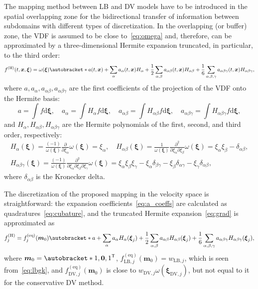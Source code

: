 \documentclass{elsarticle} %
\newcommand{\dd}{\mathrm{d}}
\newcommand{\pder}[2][]{\frac{\partial#1}{\partial#2}}
\newcommand{\pderder}[3][]{\frac{\partial^2#1}{\partial#2\partial#3}}
\newcommand{\pderderder}[4][]{\frac{\partial^3#1}{\partial#2\partial#3\partial#4}}
\newcommand{\transpose}[1]{#1^\mathsf{T}}
\DeclarePairedDelimiter\autobracket()       %
\newcommand{\br}[1]{\autobracket*{#1}}
\newcommand{\dxi}{\dd{\boldsymbol{\xi}}}
\newcommand{\bxi}{\boldsymbol{\xi}}
\newcommand{\bm}{\boldsymbol{m}}
\newcommand{\bx}{\boldsymbol{x}}
\newcommand{\equil}[1]{#1^\mathrm{(eq)}}
\newcommand{\hermite}[1]{#1^\mathrm{(H)}}
\newcommand{\LB}{\mathrm{LB}}
\newcommand{\DV}{\mathrm{DV}}
\newcommand{\Aa}{a_{\alpha}}
\newcommand{\Aab}{a_{\alpha\beta}}
\newcommand{\Aabg}{a_{\alpha\beta\gamma}}
\newcommand{\Ha}{H_{\alpha}}
\newcommand{\Hab}{H_{\alpha\beta}}
\newcommand{\Habg}{H_{\alpha\beta\gamma}}
\newcommand{\xia}{\xi_{\alpha}}
\newcommand{\xib}{\xi_{\beta}}
\newcommand{\xig}{\xi_{\gamma}}
\begin{document}
The mapping method between LB and DV models have to be introduced in the spatial overlapping zone
for the bidirectional transfer of information between subdomains with different types of discretization.
In the overlapping (or buffer) zone, the VDF is assumed to be close to~\eqref{eq:omega}
and, therefore, can be approximated by a three-dimensional Hermite expansion
truncated, in particular, to the third order:
\begin{equation}\label{eq:grad}
    \hermite{f}(t,\bx,\bxi) = \omega(\bxi)\br{ a(t,\bx)
        + \sum_{\alpha} \Aa(t,\bx) \Ha
        + \frac12 \sum_{\alpha,\beta} \Aab(t,\bx) \Hab
        + \frac16 \sum_{\alpha,\beta,\gamma} \Aabg(t,\bx) \Habg
    },
\end{equation}
where \(a, \Aa, \Aab, \Aabg\) are the first coefficients of the projection of the VDF onto the Hermite basis:
\begin{equation}\label{eq:a_coeffs}
    a = \int f\dxi, \quad \Aa = \int \Ha f\dxi, \quad \Aab = \int \Hab f\dxi, \quad \Aabg = \int \Habg f\dxi,
\end{equation}
and $\Ha, \Hab, \Habg$ are the Hermite polynomials of the first, second, and third order, respectively:
\begin{equation}\label{eq:Hermite_polynomials}
    \begin{gathered}
    \Ha(\bxi) = \frac{(-1)}{\omega(\bxi)}\pder{\xia}\omega(\bxi) = \xia, \quad
    \Hab(\bxi) = \frac{1}{\omega(\bxi)}\pderder{\xia}{\xib}\omega(\bxi) = \xia\xib - \delta_{\alpha\beta}, \\
    \Habg(\bxi) = \frac{(-1)}{\omega(\bxi)}\pderderder{\xia}{\xib}{\xig}\omega(\bxi)
        = \xia\xib\xig - \xia\delta_{\beta\gamma} - \xib\delta_{\alpha\gamma} - \xig\delta_{\alpha\beta},
    \end{gathered}
\end{equation}
where \(\delta_{\alpha\beta}\) is the Kronecker delta.

The discretization of the proposed mapping in the velocity space is straightforward:
the expansion coefficients~\eqref{eq:a_coeffs} are calculated as quadratures~\eqref{eq:cubature},
and the truncated Hermite expansion~\eqref{eq:grad} is approximated as
\begin{equation}\label{eq:discrete_grad}
    \hermite{f}_j = \equil{f}_j( \bm_0 ) \br{ a
        + \sum_{\alpha} \Aa \Ha(\bxi_j)
        + \frac12 \sum_{\alpha,\beta} \Aab \Hab(\bxi_j)
        + \frac16 \sum_{\alpha,\beta,\gamma} \Aabg \Habg(\bxi_j)
    },
\end{equation}
where \(\bm_0 = \transpose{\br{1, \boldsymbol{0}, 1}}\),
\(\equil{f}_{\LB,j}(\bm_0) = w_{\LB,j}\), which is seen from~\eqref{eq:lbgk},
and \(\equil{f}_{\DV,j}(\bm_0)\) is close to \(w_{\DV,j}\omega(\bxi_{\DV,j})\),
but not equal to it for the conservative DV method.
\end{document}
